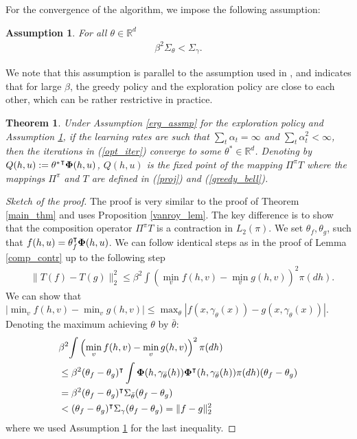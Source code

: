 \documentclass[letterpaper, 10 pt, conference]{ieeeconf}  %
\newtheorem{theorem}{Theorem}
\newtheorem{assumption}{Assumption}
\theoremstyle{definition}
\theoremstyle{remark}
\begin{document}
For the convergence of the algorithm, we impose the following assumption:
\begin{assumption}\label{rest_assmp}
For all $\theta\in\mathds{R}^d$
\begin{align*}
 \beta^2 \Sigma_\theta< \Sigma_\gamma.
\end{align*}
\end{assumption}
We note that this assumption is parallel to the assumption used in \cite{melo2008analysis}, and indicates that for large $\beta$, the greedy policy and the exploration policy are close to each other, which can be rather restrictive in practice.
\begin{theorem}
Under Assumption \ref{erg_assmp} for the exploration policy and Assumption \ref{rest_assmp}, if the learning rates are such that $\sum_t\alpha_t = \infty$ and $\sum_t \alpha_t^2<\infty$, then the iterations in (\ref{opt_iter}) converge to some $\theta^* \in\mathds{R}^d$. Denoting by $Q(h,u):={\theta^*}^\intercal {\bf \Phi}(h,u)$, $Q(h,u)$ is the fixed point of the mapping $\Pi^\pi T $ where the mappings $\Pi^\pi$ and $T$ are defined in (\ref{proj}) and (\ref{greedy_bell}).
\end{theorem}
\begin{proof}[Sketch of the proof]
The proof is very similar to the proof of Theorem \ref{main_thm} and uses Proposition \ref{vanroy_lem}. The key difference is to show that the composition operator $\Pi^\pi T $ is a contraction in $L_2(\pi)$. We set $\theta_f,\theta_g$, such that $f(h,u)=\theta_f^\intercal {\bf \Phi}(h,u)$.
 We can follow identical steps as in the proof of Lemma \ref{comp_contr} up to the following step
\begin{align*}
&\| T (f) -  T (g)\|^2_2 \leq \beta^2 {   \int \left(\min_vf(h,v) - \min_vg(h,v)\right)^2 \pi(dh) }.
\end{align*}
We can show that 
$\left|\min_vf(h,v) - \min_vg(h,v)\right|\leq \max_\theta \left|f(x,\gamma_\theta(x))-g(x,\gamma_\theta(x))\right|$. Denoting the maximum achieving $\theta$ by $\bar{\theta}$:
\begin{align*}
&\beta^2 {   \int \left(\min_vf(h,v) - \min_vg(h,v)\right)^2 \pi(dh) } \\
&\leq\beta^2 (\theta_f-\theta_g)^\intercal \int {\bf \Phi}(h,\gamma_{\bar{\theta}}(h))  {\bf \Phi}^\intercal(h,\gamma_{\bar{\theta}}(h)) \pi(dh)(\theta_f-\theta_g)\\
&=  \beta^2(\theta_f-\theta_g)^\intercal \Sigma_{\bar{\theta}}  (\theta_f-\theta_g)\\
&<(\theta_f-\theta_g)^\intercal \Sigma_{\gamma}  (\theta_f-\theta_g) = \|f-g\|_2^2
\end{align*}
where we used Assumption \ref{rest_assmp} for the last inequality.
\end{proof}
\end{document}
